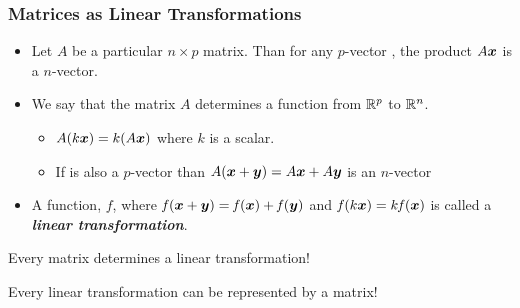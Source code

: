 \documentclass{beamer}
\begin{document}


\begin{frame}
  \frametitle{Matrices as Linear Transformations}

\begin{itemize}  

\item Let $A$ be a particular $n \times p$ matrix. Than for any $p$-vector , the product $A\bm{x}$ is a $n$-vector.

\item We say that the matrix $A$ determines a function from $\mathbb{R}^p$ to $\mathbb{R}^n$.  

\begin{itemize}
\item $A(k \bm{x}) = k(A \bm{x})$ where $k$ is a scalar.
\item If  is also a $p$-vector than $A(\bm{x}+\bm{y}) = A\bm{x} + A\bm{y}$ is  an $n$-vector
\end{itemize}


\item A function, $\mathit{f}$, where $\mathit{f}(\bm{x} + \bm{y}) = \mathit{f}(\bm{x}) + \mathit{f}(\bm{y})$ and $\mathit{f}(k\bm{x}) = k\mathit{f}(\bm{x})$ is called a \emph{\textbf{linear transformation}}.

\end{itemize}

\begin{Highlight}
Every matrix determines a linear transformation!

\medskip

Every linear transformation can be represented by a matrix!
\end{Highlight}

\end{frame}
\end{document}
